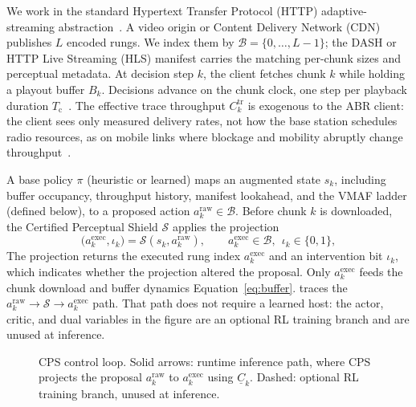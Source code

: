 We work in the standard Hypertext Transfer Protocol (HTTP) adaptive-streaming abstraction~\cite{yin2015control,mao2017neural,sodagar2011mpeg}.
A video origin or Content Delivery Network (CDN) publishes \(L\) encoded rungs.
We index them by \(\mathcal{B}=\{0,\ldots,L{-}1\}\); the DASH or HTTP Live Streaming (HLS) manifest carries the matching per-chunk sizes and perceptual metadata.
At decision step \(k\), the client fetches chunk \(k\) while holding a playout buffer \(B_k\).
Decisions advance on the chunk clock, one step per playback duration \(T_{\mathrm{c}}\)~\cite{mao2017neural,yin2015control}.
The effective trace throughput \(C^{\mathrm{tr}}_k\) is exogenous to the ABR client: the client sees only measured delivery rates, not how the base station schedules radio resources, as on mobile links where blockage and mobility abruptly change throughput~\cite{narayanan2021variegated,cisco2023}.

A base policy \(\pi\) (heuristic or learned) maps an augmented state \(s_k\), including buffer occupancy, throughput history, manifest lookahead, and the VMAF ladder (defined below), to a proposed action \(a^{\mathrm{raw}}_k\in\mathcal{B}\).
Before chunk \(k\) is downloaded, the Certified Perceptual Shield \(\mathcal{S}\) applies the projection
\begin{equation}
\label{eq:shield-map}
    \big(a^{\mathrm{exec}}_k,\iota_k\big)=\mathcal{S}\!\left(s_k,a^{\mathrm{raw}}_k\right),\qquad a^{\mathrm{exec}}_k\in\mathcal{B},\ \ \iota_k\in\{0,1\},
\end{equation}
The projection returns the executed rung index \(a^{\mathrm{exec}}_k\) and an intervention bit \(\iota_k\), which indicates whether the projection altered the proposal.
Only \(a^{\mathrm{exec}}_k\) feeds the chunk download and buffer dynamics Equation~\eqref{eq:buffer}.
 traces the \(a^{\mathrm{raw}}_k\!\rightarrow\!\mathcal{S}\!\rightarrow\!a^{\mathrm{exec}}_k\) path.
That path does not require a learned host: the actor, critic, and dual variables in the figure are an optional RL training branch and are unused at inference.

\begin{figure}[!t]
    \centering
    \caption{CPS control loop. Solid arrows: runtime inference path, where CPS projects the proposal \(a^{\mathrm{raw}}_k\) to \(a^{\mathrm{exec}}_k\) using \(\underline{C}_k\). Dashed: optional RL training branch, unused at inference.}
    \label{fig:arch}
\end{figure}

